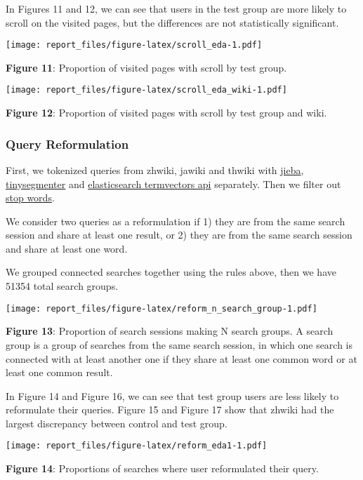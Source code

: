 \documentclass[12pt,]{article}
\begin{document}
In Figures 11 and 12, we can see that users in the test group are more
likely to scroll on the visited pages, but the differences are not
statistically significant.

\texttt{[image: report\_files/figure-latex/scroll\_eda-1.pdf]}

\textbf{Figure 11}: Proportion of visited pages with scroll by test
group.

\texttt{[image: report\_files/figure-latex/scroll\_eda\_wiki-1.pdf]}

\textbf{Figure 12}: Proportion of visited pages with scroll by test
group and wiki.

\subsubsection{Query Reformulation}\label{query-reformulation}

First, we tokenized queries from zhwiki, jawiki and thwiki with
\href{https://github.com/fxsjy/jieba}{jieba},
\href{https://pypi.python.org/pypi/tinysegmenter}{tinysegmenter} and
\href{https://www.elastic.co/guide/en/elasticsearch/reference/current/docs-termvectors.html}{elasticsearch
termvectors api} separately. Then we filter out
\href{https://github.com/6/stopwords-json}{stop words}.

We consider two queries as a reformulation if 1) they are from the same
search session and share at least one result, or 2) they are from the
same search session and share at least one word.

We grouped connected searches together using the rules above, then we
have 51354 total search groups.

\texttt{[image: report\_files/figure-latex/reform\_n\_search\_group-1.pdf]}

\textbf{Figure 13}: Proportion of search sessions making N search
groups. A search group is a group of searches from the same search
session, in which one search is connected with at least another one if
they share at least one common word or at least one common result.

In Figure 14 and Figure 16, we can see that test group users are less
likely to reformulate their queries. Figure 15 and Figure 17 show that
zhwiki had the largest discrepancy between control and test group.

\texttt{[image: report\_files/figure-latex/reform\_eda1-1.pdf]}

\textbf{Figure 14}: Proportions of searches where user reformulated
their query.
\end{document}
